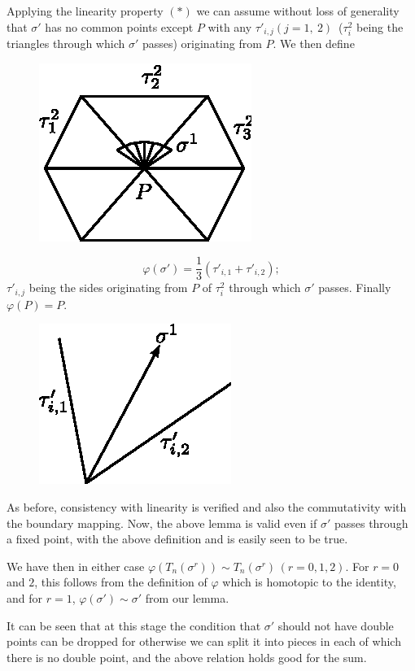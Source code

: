   Applying the linearity property $(*)$ we can assume without loss of
  generality that $\sigma'$ has no common points except $P$ with any
  $\tau'_{i, j} (j = 1, ~ 2)$ \,($\tau^2_i$ being the triangles through
  which $\sigma'$ passes) originating  from $P$. We then define 
   \begin{figure}[H]
    \centerline{\includegraphics{vol9-figures/fig9-16.eps}}
  \end{figure}
  $$
  \varphi (\sigma') = \frac{1}{3} \left(\tau'_{i, 1} + \tau'_{i, 2}\right);
  $$
  $\tau'_{i, j}$ being the sides originating from $P$ of $\tau^2_i$
  through which $\sigma'$ passes. Finally $\varphi (P) = P$. 
     \begin{figure}[H]
    \centerline{\includegraphics{vol9-figures/fig9-17.eps}}
  \end{figure}

  As before, consistency with linearity is verified and also the
  commutativity with the boundary mapping. Now, the above lemma is
  valid even if $\sigma'$ passes through a fixed point, with the
  above definition and is easily seen to be true. 
  
  We have then in either case $\varphi (T_n (\sigma^r)) \sim T_n
  (\sigma^r)\, (r = 0, 1, 2)$. For $r=0$ and $2$, this follows from the
  definition of $\varphi$ which is homotopic to the identity, and for
  $r = 1$, $\varphi (\sigma') \sim \sigma'$ from our lemma. 
  
  It can be seen that at this stage the condition that $\sigma'$
  should not have double points can be dropped for otherwise we can
  split it into pieces in each of which there is no double point, and
  the above relation holds good for the sum. 
  
